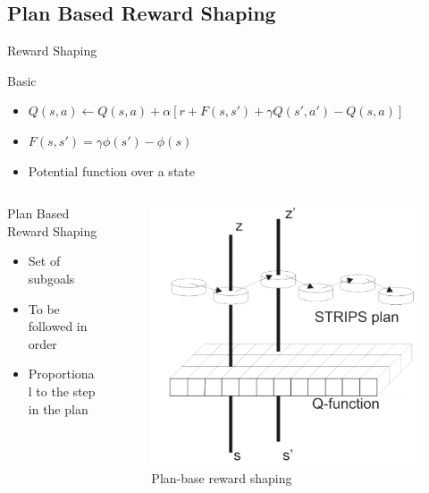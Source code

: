 \documentclass{bredelebeamer}
\begin{document}
\subsection{Plan Based Reward Shaping}
\begin{frame}{Reward Shaping}

\begin{block}{Basic}
\begin{itemize}
\item $Q(s, a) \leftarrow  Q(s, a) +  \alpha [r + F(s, s') + \gamma Q(s', a') - Q(s,a)]$
\item $F(s, s') =\gamma \phi (s') - \phi (s)$
\item Potential function over a state
\end{itemize}
\end{block}

\begin{columns}

\begin{column}{0.7\linewidth}

\begin{block}{Plan Based Reward Shaping}
\begin{itemize}
\item Set of subgoals
\item To be followed in order
\item Proportional to the step in the plan
\end{itemize}
\end{block}

\end{column}

\begin{column}{0.3\linewidth}

\begin{figure}[h!]
\centering
  \includegraphics[width = \linewidth]{../article/img/strips.png}
  \caption{Plan-base reward shaping}
  \label{fig:strips}
\end{figure}


\end{column}
\end{columns}
\end{frame}
\end{document}

